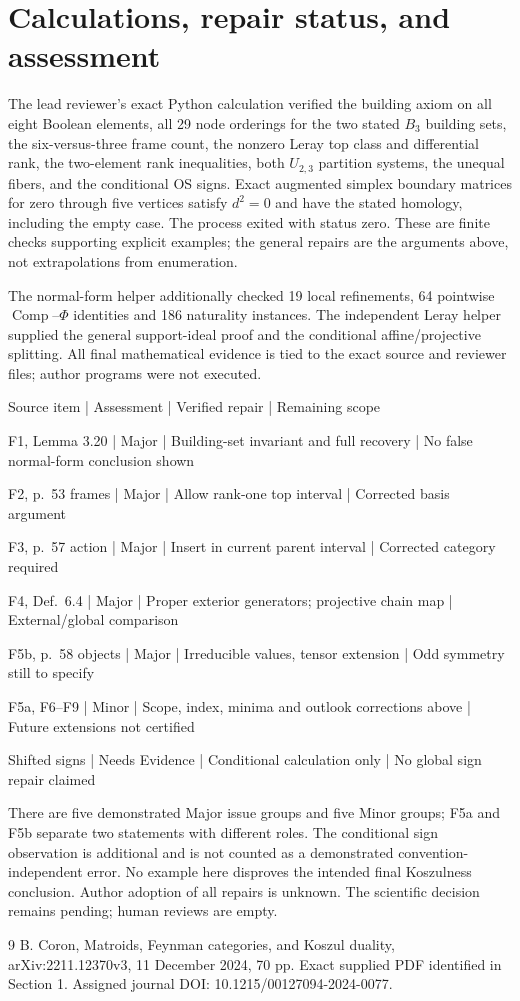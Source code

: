 \documentclass[10pt]{article}
\begin{document}
\section*{Calculations, repair status, and assessment}
The lead reviewer’s exact Python calculation verified the building axiom on all eight Boolean elements, all 29 node orderings for the two stated \(B_3\) building sets, the six-versus-three frame count, the nonzero Leray top class and differential rank, the two-element rank inequalities, both \(U_{2,3}\) partition systems, the unequal fibers, and the conditional OS signs. Exact augmented simplex boundary matrices for zero through five vertices satisfy \(d^2=0\) and have the stated homology, including the empty case. The process exited with status zero. These are finite checks supporting explicit examples; the general repairs are the arguments above, not extrapolations from enumeration.\par
The normal-form helper additionally checked 19 local refinements, 64 pointwise \(\operatorname{Comp}\)–\(\Phi\) identities and 186 naturality instances. The independent Leray helper supplied the general support-ideal proof and the conditional affine/projective splitting. All final mathematical evidence is tied to the exact source and reviewer files; author programs were not executed.\par
Source item | Assessment | Verified repair | Remaining scope\par
F1, Lemma 3.20 | Major | Building-set invariant and full recovery | No false normal-form conclusion shown\par
F2, p. 53 frames | Major | Allow rank-one top interval | Corrected basis argument\par
F3, p. 57 action | Major | Insert in current parent interval | Corrected category required\par
F4, Def. 6.4 | Major | Proper exterior generators; projective chain map | External/global comparison\par
F5b, p. 58 objects | Major | Irreducible values, tensor extension | Odd symmetry still to specify\par
F5a, F6–F9 | Minor | Scope, index, minima and outlook corrections above | Future extensions not certified\par
Shifted signs | Needs Evidence | Conditional calculation only | No global sign repair claimed\par
There are five demonstrated Major issue groups and five Minor groups; F5a and F5b separate two statements with different roles. The conditional sign observation is additional and is not counted as a demonstrated convention-independent error. No example here disproves the intended final Koszulness conclusion. Author adoption of all repairs is unknown. The scientific decision remains pending; human reviews are empty.\par
9 B. Coron, Matroids, Feynman categories, and Koszul duality, arXiv:2211.12370v3, 11 December 2024, 70 pp. Exact supplied PDF identified in Section 1. Assigned journal DOI: 10.1215/00127094-2024-0077.\par
\end{document}
